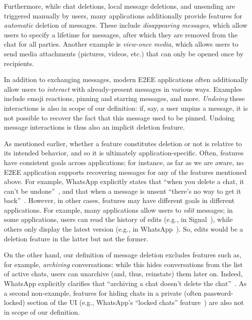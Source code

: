 Furthermore, while chat deletions, local message deletions, and unsending are triggered manually by users, many applications additionally provide features for \emph{automatic} deletion of messages. These include \emph{disappearing messages}, which allow users to specify a lifetime for messages, after which they are removed from the chat for all parties. Another example is \emph{view-once media}, which allows users to send media attachments (pictures, videos, etc.) that can only be opened once by recipients.

In addition to exchanging messages, modern E2EE applications often additionally allow users to \emph{interact} with already-present messages in various ways. Examples include emoji reactions, pinning and starring messages, and more. \emph{Undoing} these interactions is also in scope of our definition: if, say, a user unpins a message, it is not possible to recover the fact that this message used to be pinned. Undoing message interactions is thus also an implicit deletion feature.



As mentioned earlier, whether a feature constitutes deletion or not is relative to its intended behavior, and so it is ultimately application-specific. Often, features have consistent goals across applications; for instance, as far as we are aware, no E2EE application supports recovering messages for any of the features mentioned above. For example, WhatsApp explicitly states that ``when you delete a chat, it can't be undone''~\cite{whatsapp-delete-chat}, and that when a message is unsent ``there's no way to get it back''~\cite{whatsapp-delete-message}. However, in other cases, features may have different goals in different applications. For example, many applications allow users to \emph{edit} messages; in some applications, users can read the history of edits (e.g., in Signal~\cite{signal-edit-message}), while others only display the latest version (e.g., in WhatsApp~\cite{whatsapp-edit-message}). So, edits would be a deletion feature in the latter but not the former.

On the other hand, our definition of message deletion excludes features such as, for example, \emph{archiving} conversations: while this hides conversations from the list of active chats, users can unarchive (and, thus, reinstate) them later on. Indeed, WhatsApp explicitly clarifies that ``archiving a chat doesn't delete the chat''~\cite{whatsapp-archive-chat}. As a second non-example, features for hiding chats in a private (often password-locked) section of the UI (e.g., WhatsApp's ``locked chats'' feature~\cite{whatsapp-locked-chat}) are also not in scope of our definition.

